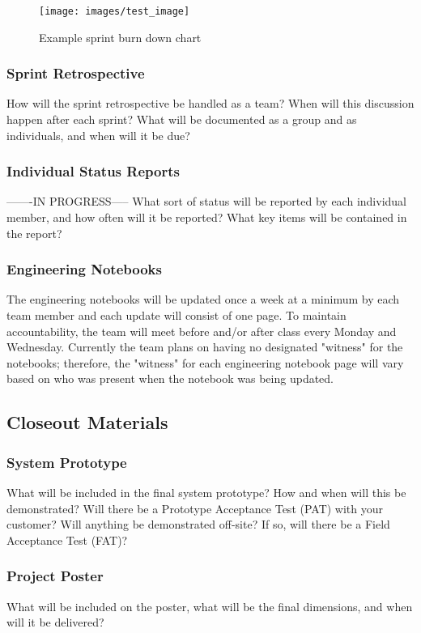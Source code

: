 \begin{figure}[h!]
    \centering
    \texttt{[image: images/test\_image]}
    \caption{Example sprint burn down chart}
\end{figure}

\subsubsection{Sprint Retrospective}
How will the sprint retrospective be handled as a team? When will this discussion happen after each sprint? What will be documented as a group and as individuals, and when will it be due?

\subsubsection{Individual Status Reports}
-------IN PROGRESS-----
What sort of status will be reported by each individual member, and how often will it be reported? What key items will be contained in the report?

\subsubsection{Engineering Notebooks}
The engineering notebooks will be updated once a week at a minimum by each team member and each update will consist of one page. To maintain accountability, the team will meet before and/or after class every Monday and Wednesday. Currently the team plans on having no designated "witness" for the notebooks; therefore, the "witness" for each engineering notebook page will vary based on who was present when the notebook was being updated.

\subsection{Closeout Materials}

\subsubsection{System Prototype}
What will be included in the final system prototype? How and when will this be demonstrated? Will there be a Prototype Acceptance Test (PAT) with your customer? Will anything be demonstrated off-site? If so, will there be a Field Acceptance Test (FAT)?

\subsubsection{Project Poster}
What will be included on the poster, what will be the final dimensions, and when will it be delivered?

